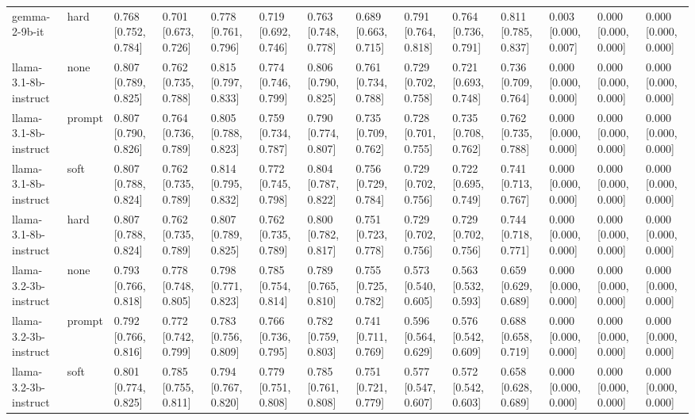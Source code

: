 \begin{tabular}{llllllllllllll}
gemma-2-9b-it & hard & 0.768 [0.752, 0.784] & 0.701 [0.673, 0.726] & 0.778 [0.761, 0.796] & 0.719 [0.692, 0.746] & 0.763 [0.748, 0.778] & 0.689 [0.663, 0.715] & 0.791 [0.764, 0.818] & 0.764 [0.736, 0.791] & 0.811 [0.785, 0.837] & 0.003 [0.000, 0.007] & 0.000 [0.000, 0.000] & 0.000 [0.000, 0.000] \\
llama-3.1-8b-instruct & none & 0.807 [0.789, 0.825] & 0.762 [0.735, 0.788] & 0.815 [0.797, 0.833] & 0.774 [0.746, 0.799] & 0.806 [0.790, 0.825] & 0.761 [0.734, 0.788] & 0.729 [0.702, 0.758] & 0.721 [0.693, 0.748] & 0.736 [0.709, 0.764] & 0.000 [0.000, 0.000] & 0.000 [0.000, 0.000] & 0.000 [0.000, 0.000] \\
llama-3.1-8b-instruct & prompt & 0.807 [0.790, 0.826] & 0.764 [0.736, 0.789] & 0.805 [0.788, 0.823] & 0.759 [0.734, 0.787] & 0.790 [0.774, 0.807] & 0.735 [0.709, 0.762] & 0.728 [0.701, 0.755] & 0.735 [0.708, 0.762] & 0.762 [0.735, 0.788] & 0.000 [0.000, 0.000] & 0.000 [0.000, 0.000] & 0.000 [0.000, 0.000] \\
llama-3.1-8b-instruct & soft & 0.807 [0.788, 0.824] & 0.762 [0.735, 0.789] & 0.814 [0.795, 0.832] & 0.772 [0.745, 0.798] & 0.804 [0.787, 0.822] & 0.756 [0.729, 0.784] & 0.729 [0.702, 0.756] & 0.722 [0.695, 0.749] & 0.741 [0.713, 0.767] & 0.000 [0.000, 0.000] & 0.000 [0.000, 0.000] & 0.000 [0.000, 0.000] \\
llama-3.1-8b-instruct & hard & 0.807 [0.788, 0.824] & 0.762 [0.735, 0.789] & 0.807 [0.789, 0.825] & 0.762 [0.735, 0.789] & 0.800 [0.782, 0.817] & 0.751 [0.723, 0.778] & 0.729 [0.702, 0.756] & 0.729 [0.702, 0.756] & 0.744 [0.718, 0.771] & 0.000 [0.000, 0.000] & 0.000 [0.000, 0.000] & 0.000 [0.000, 0.000] \\
llama-3.2-3b-instruct & none & 0.793 [0.766, 0.818] & 0.778 [0.748, 0.805] & 0.798 [0.771, 0.823] & 0.785 [0.754, 0.814] & 0.789 [0.765, 0.810] & 0.755 [0.725, 0.782] & 0.573 [0.540, 0.605] & 0.563 [0.532, 0.593] & 0.659 [0.629, 0.689] & 0.000 [0.000, 0.000] & 0.000 [0.000, 0.000] & 0.000 [0.000, 0.000] \\
llama-3.2-3b-instruct & prompt & 0.792 [0.766, 0.816] & 0.772 [0.742, 0.799] & 0.783 [0.756, 0.809] & 0.766 [0.736, 0.795] & 0.782 [0.759, 0.803] & 0.741 [0.711, 0.769] & 0.596 [0.564, 0.629] & 0.576 [0.542, 0.609] & 0.688 [0.658, 0.719] & 0.000 [0.000, 0.000] & 0.000 [0.000, 0.000] & 0.000 [0.000, 0.000] \\
llama-3.2-3b-instruct & soft & 0.801 [0.774, 0.825] & 0.785 [0.755, 0.811] & 0.794 [0.767, 0.820] & 0.779 [0.751, 0.808] & 0.785 [0.761, 0.808] & 0.751 [0.721, 0.779] & 0.577 [0.547, 0.607] & 0.572 [0.542, 0.603] & 0.658 [0.628, 0.689] & 0.000 [0.000, 0.000] & 0.000 [0.000, 0.000] & 0.000 [0.000, 0.000] \\

\end{tabular}
